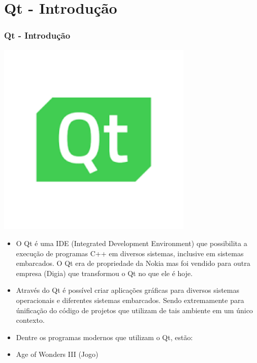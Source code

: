 \documentclass[10pt]{beamer}
\theoremstyle{remark}
\theoremstyle{definition}
\begin{document}
\section{Qt - Introdução}
\begin{frame}[allowframebreaks]
\frametitle{Qt - Introdução}
		
	\begin{center}
		\includegraphics[width=0.7\textwidth]{images/12.png}
	\end{center}
	
	\framebreak

	\begin{itemize}
		\item O Qt é uma IDE (Integrated Development Environment) que possibilita a execução de programas C++ em diversos sistemas, inclusive em sistemas embarcados. O Qt era de propriedade da Nokia mas foi vendido para outra empresa (Digia) que transformou o Qt no que ele é hoje.
		
		\item Através do Qt é possível criar aplicações gráficas para diversos sistemas operacionais e diferentes sistemas embarcados. Sendo extremamente para únificação do código de projetos que utilizam de tais ambiente em um único contexto.
		

	\end{itemize}		
	
	\framebreak
		
	\begin{itemize}
		\item Dentre os programas modernos que utilizam o Qt, estão:
		
		\item Age of Wonders III (Jogo)
		

\end{itemize}
\end{frame}
\end{document}
